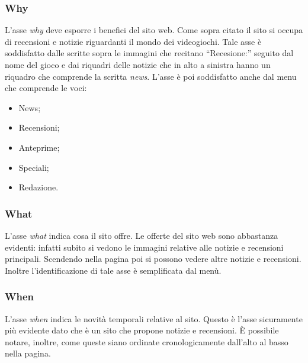 \documentclass[../ProgettoTecWeb2.tex]{subfiles}
\begin{document}
		\subsubsection{Why}
			L'asse \textit{why} deve esporre i benefici del sito web. Come sopra citato il sito si occupa di recensioni e notizie riguardanti il mondo dei videogiochi. Tale asse è soddisfatto dalle scritte sopra le immagini che recitano ``Recesione:'' seguito dal nome del gioco e dai riquadri delle notizie che in alto a sinistra hanno un riquadro che comprende la scritta \textit{news}. L'asse è poi soddisfatto anche dal menu che comprende le voci:
			\begin{itemize}
				\item News;
				\item Recensioni;
				\item Anteprime;
				\item Speciali;
				\item Redazione.
			\end{itemize}
		\subsubsection{What}
			L'asse \textit{what} indica cosa il sito offre. Le offerte del sito web sono abbastanza evidenti: infatti subito si vedono le immagini relative alle notizie e recensioni principali. Scendendo nella pagina poi si possono vedere altre notizie e recensioni. Inoltre l'identificazione di tale asse è semplificata dal menù.
		\subsubsection{When}
			L'asse \textit{when} indica le novità temporali relative al sito. Questo è l'asse sicuramente più evidente dato che è un sito che propone notizie e recensioni. È possibile notare, inoltre, come queste siano ordinate cronologicamente dall'alto al basso nella pagina.
\end{document}
